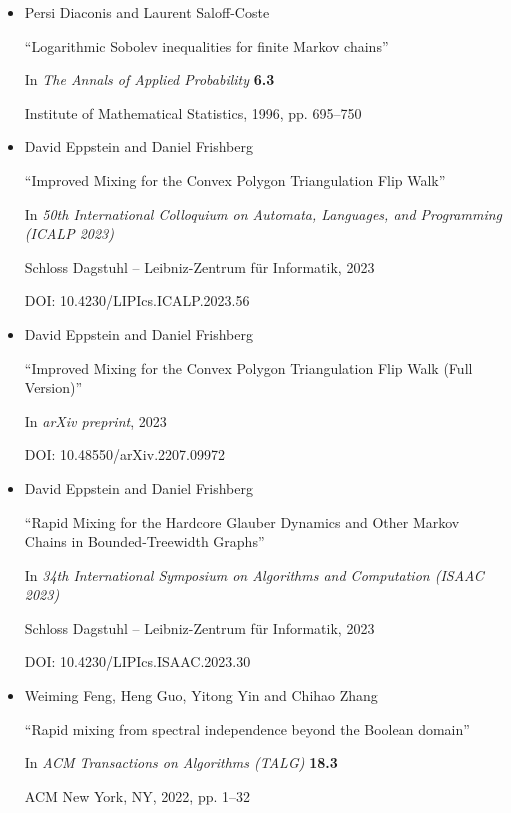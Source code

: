 \documentclass[10pt,a4paper]{article}
\begin{document}
\begin{itemize}
      

\item[] [DS96]
Persi Diaconis and Laurent Saloff-Coste

“Logarithmic Sobolev inequalities for finite Markov chains”

In \emph{The Annals of Applied Probability} \textbf{6.3}

Institute of Mathematical Statistics, 1996, pp. 695–750


      

\item[] [EF23]
David Eppstein and Daniel Frishberg

“Improved Mixing for the Convex Polygon Triangulation Flip Walk”

In \emph{50th International Colloquium on Automata, Languages, and Programming (ICALP 2023)}

Schloss Dagstuhl – Leibniz-Zentrum für Informatik, 2023

DOI: 10.4230/LIPIcs.ICALP.2023.56


      

\item[] [EF23a]
David Eppstein and Daniel Frishberg

“Improved Mixing for the Convex Polygon Triangulation Flip Walk (Full Version)”

In \emph{arXiv preprint}, 2023

DOI: 10.48550/arXiv.2207.09972


      

\item[] [EF23b]
David Eppstein and Daniel Frishberg

“Rapid Mixing for the Hardcore Glauber Dynamics and Other Markov Chains in Bounded-Treewidth Graphs”

In \emph{34th International Symposium on Algorithms and Computation (ISAAC 2023)}

Schloss Dagstuhl – Leibniz-Zentrum für Informatik, 2023

DOI: 10.4230/LIPIcs.ISAAC.2023.30


      

\item[] [Fen+22]
Weiming Feng, Heng Guo, Yitong Yin and Chihao Zhang

“Rapid mixing from spectral independence beyond the Boolean domain”

In \emph{ACM Transactions on Algorithms (TALG)} \textbf{18.3}

ACM New York, NY, 2022, pp. 1–32



\end{itemize}
\end{document}
